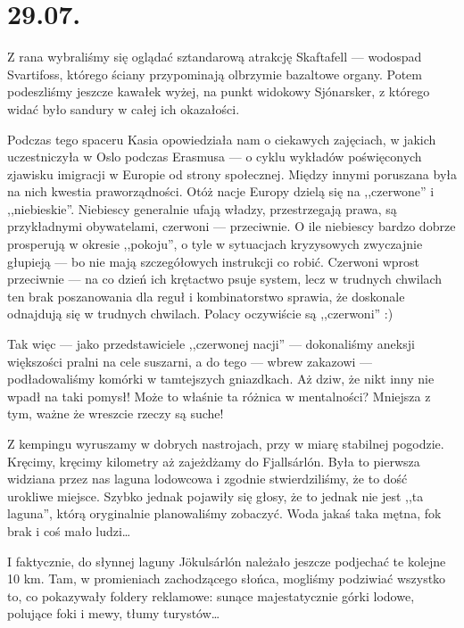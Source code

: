 \chapter*{29.07.}

Z rana wybraliśmy się oglądać sztandarową atrakcję Skaftafell --- wodospad Svartifoss, którego ściany przypominają olbrzymie bazaltowe organy. Potem podeszliśmy jeszcze kawałek wyżej, na punkt widokowy Sjónarsker, z którego widać było sandury w całej ich okazałości.

Podczas tego spaceru Kasia opowiedziała nam o ciekawych zajęciach, w jakich uczestniczyła w Oslo podczas Erasmusa --- o cyklu wykładów poświęconych zjawisku imigracji w Europie od strony społecznej. Między innymi poruszana była na nich kwestia praworządności. Otóż nacje Europy dzielą się na ,,czerwone'' i ,,niebieskie''. Niebiescy generalnie ufają władzy, przestrzegają prawa, są przykładnymi obywatelami, czerwoni --- przeciwnie. O ile niebiescy bardzo dobrze prosperują w okresie ,,pokoju'', o tyle w sytuacjach kryzysowych zwyczajnie głupieją --- bo nie mają szczegółowych instrukcji co robić. Czerwoni wprost przeciwnie --- na co dzień ich krętactwo psuje system, lecz w trudnych chwilach ten brak poszanowania dla reguł i kombinatorstwo sprawia, że doskonale odnajdują się w trudnych chwilach. Polacy oczywiście są ,,czerwoni'' :)

Tak więc --- jako przedstawiciele ,,czerwonej nacji'' --- dokonaliśmy aneksji większości pralni na cele suszarni, a do tego --- wbrew zakazowi --- podładowaliśmy komórki w tamtejszych gniazdkach. Aż dziw, że nikt inny nie wpadł na taki pomysł! Może to właśnie ta różnica w mentalności? Mniejsza z tym, ważne że wreszcie rzeczy są suche!


Z kempingu wyruszamy w dobrych nastrojach, przy w miarę stabilnej pogodzie. Kręcimy, kręcimy kilometry aż zajeżdżamy do Fjallsárlón. Była to pierwsza widziana przez nas laguna lodowcowa i zgodnie stwierdziliśmy, że to dość urokliwe miejsce. Szybko jednak pojawiły się głosy, że to jednak nie jest ,,ta laguna'', którą oryginalnie planowaliśmy zobaczyć. Woda jakaś taka mętna, fok brak i coś mało ludzi…


I faktycznie, do słynnej laguny Jökulsárlón należało jeszcze podjechać te kolejne 10 km. Tam, w promieniach zachodzącego słońca, mogliśmy podziwiać wszystko to, co pokazywały foldery reklamowe: sunące majestatycznie górki lodowe, polujące foki i mewy, tłumy turystów…

